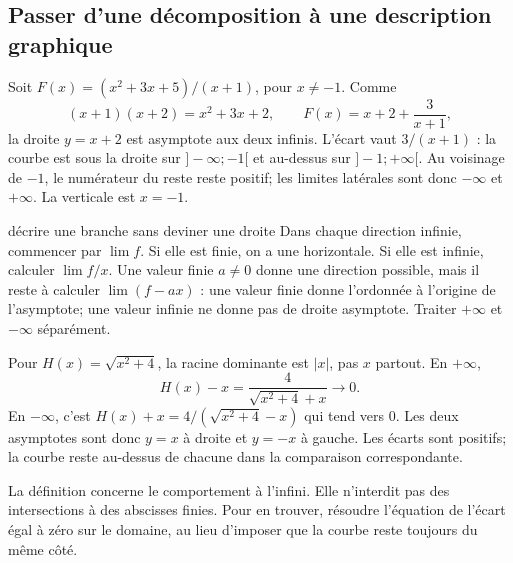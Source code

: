 \subsection*{Passer d’une décomposition à une description graphique}
\begin{exemple}
Soit $F(x)=(x^2+3x+5)/(x+1)$, pour $x\ne-1$. Comme
\[
(x+1)(x+2)=x^2+3x+2,
\qquad F(x)=x+2+\frac3{x+1},
\]
la droite $y=x+2$ est asymptote aux deux infinis. L’écart vaut $3/(x+1)$ : la courbe est sous la droite sur $]-\infty;-1[$ et au-dessus sur $]-1;+\infty[$. Au voisinage de $-1$, le numérateur du reste reste positif; les limites latérales sont donc $-\infty$ et $+\infty$. La verticale est $x=-1$.
\end{exemple}
\begin{methode}{décrire une branche sans deviner une droite}
Dans chaque direction infinie, commencer par $\lim f$. Si elle est finie, on a une horizontale. Si elle est infinie, calculer $\lim f/x$. Une valeur finie $a\ne0$ donne une direction possible, mais il reste à calculer $\lim(f-ax)$ : une valeur finie donne l’ordonnée à l’origine de l’asymptote; une valeur infinie ne donne pas de droite asymptote. Traiter $+\infty$ et $-\infty$ séparément.
\end{methode}
\begin{exemple}
Pour $H(x)=\sqrt{x^2+4}$, la racine dominante est $|x|$, pas $x$ partout. En $+\infty$,
\[
H(x)-x=\frac4{\sqrt{x^2+4}+x}\longrightarrow0.
\]
En $-\infty$, c’est $H(x)+x=4/(\sqrt{x^2+4}-x)$ qui tend vers $0$. Les deux asymptotes sont donc $y=x$ à droite et $y=-x$ à gauche. Les écarts sont positifs; la courbe reste au-dessus de chacune dans la comparaison correspondante.
\end{exemple}
\begin{remarque}
La définition concerne le comportement à l’infini. Elle n’interdit pas des intersections à des abscisses finies. Pour en trouver, résoudre l’équation de l’écart égal à zéro sur le domaine, au lieu d’imposer que la courbe reste toujours du même côté.
\end{remarque}

